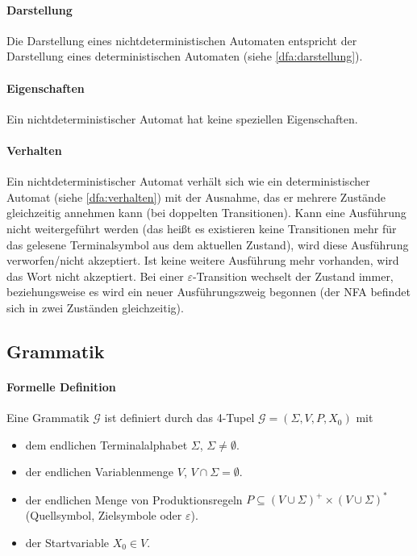         \paragraph{Darstellung}
            Die Darstellung eines nichtdeterministischen Automaten entspricht der Darstellung eines deterministischen Automaten (siehe \ref{dfa:darstellung}).

        \paragraph{Eigenschaften}
            Ein nichtdeterministischer Automat hat keine speziellen Eigenschaften.

        \paragraph{Verhalten}
            Ein nichtdeterministischer Automat verhält sich wie ein deterministischer Automat (siehe \ref{dfa:verhalten}) mit der Ausnahme, das er mehrere Zustände gleichzeitig annehmen kann (bei doppelten Transitionen). Kann eine Ausführung nicht weitergeführt werden (das heißt es existieren keine Transitionen mehr für das gelesene Terminalsymbol aus dem aktuellen Zustand), wird diese Ausführung verworfen/nicht akzeptiert. Ist keine weitere Ausführung mehr vorhanden, wird das Wort nicht akzeptiert. Bei einer $ \varepsilon $-Transition wechselt der Zustand immer, beziehungsweise es wird ein neuer Ausführungszweig begonnen (der NFA befindet sich in zwei Zuständen gleichzeitig).


    \subsection{Grammatik}
        \paragraph{Formelle Definition}
            Eine Grammatik $ \mathcal{G} $ ist definiert durch das 4-Tupel $ \mathcal{G} = (\Sigma, V, P, X _ 0) $ mit
            \begin{itemize}
                \item dem endlichen Terminalalphabet $ \Sigma $, $ \Sigma \neq \emptyset $.
                \item der endlichen Variablenmenge $ V $, $ V \cap \Sigma = \emptyset $.
                \item der endlichen Menge von Produktionsregeln $ P \subseteq (V \cup \Sigma) ^ + \times (V \cup \Sigma) ^ * $ (Quellsymbol, Zielsymbole oder $ \varepsilon $).
                \item der Startvariable $ X _ 0 \in V $.
            \end{itemize}

